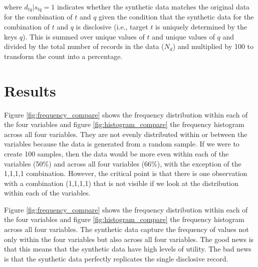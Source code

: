 \documentclass[runningheads]{llncs}
\begin{document}
where $d_{tq} | s_{tq} = 1$ indicates whether the synthetic data matches the original data for the combination of $t$ and $q$ given the condition that the synthetic data for the combination of $t$ and $q$ is disclosive (i.e., target $t$ is uniquely determined by the keys $q$).  This is summed over unique values of $t$ and unique values of $q$ and divided by the total number of records in the data ($N_{d}$) and multiplied by 100 to transform the count into a percentage.

\section{Results}

Figure \ref{fig:frequency_compare} shows the frequency distribution within each of the four variables and figure \ref{fig:histogram_compare} the frequency histogram across all four variables.  They are not evenly distributed within or between the variables because the data is generated from a random sample.  If we were to create 100 samples, then the data would be more even within each of the variables (50\%) and across all four variables (66\%), with the exception of the 1,1,1,1 combination.  However, the critical point is that there is one observation with a combination (1,1,1,1) that is not visible if we look at the distribution within each of the variables.

Figure \ref{fig:frequency_compare} shows the frequency distribution within each of the four variables and figure \ref{fig:histogram_compare} the frequency histogram across all four variables.  The synthetic data capture the frequency of values not only within the four variables but also across all four variables.  The good news is that this means that the synthetic data have high levels of utility.  The bad news is that the synthetic data perfectly replicates the single disclosive record.
\end{document}
